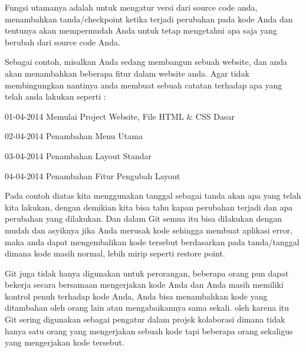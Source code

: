 \noindent 
Fungsi utamanya adalah untuk mengatur versi dari source code anda, menambahkan tanda/checkpoint ketika terjadi perubahan pada kode Anda dan tentunya akan mempermudah Anda untuk tetap mengetahui apa saja yang berubah dari source code Anda. \par
\vspace{12pt}
\noindent 
Sebagai contoh, misalkan Anda sedang membangun sebuah website, dan anda akan menambahkan beberapa fitur dalam website anda. Agar tidak membingungkan nantinya anda membuat sebuah catatan terhadap apa yang telah anda lakukan seperti : \par
\vspace{12pt}
\noindent 
 \hspace*{0.5in} 01-04-2014 Memulai Project Website, File HTML  $  \&  $ CSS Dasar \par
\noindent 
 \hspace*{0.5in} 02-04-2014 Penambahan Menu Utama \par
\noindent 
 \hspace*{0.5in} 03-04-2014 Penambahan Layout Standar \par
\noindent 
 \hspace*{0.5in} 04-04-2014 Penambahan Fitur Pengubah Layout \par
\vspace{12pt}
\vspace{12pt}
\noindent 
 \hspace*{0.5in} Pada contoh diatas kita menggunakan tanggal sebagai tanda akan apa yang telah kita lakukan, dengan demikian kita bisa tahu kapan perubahan terjadi dan apa perubahan yang dilakukan. Dan dalam Git semua itu bisa dilakukan dengan mudah dan asyiknya jika Anda merusak kode sehingga membuat aplikasi error, maka anda dapat mengembalikan kode tersebut berdasarkan pada tanda/tanggal dimana kode masih normal, lebih mirip seperti restore point. \par
\vspace{12pt}
\noindent 
Git juga tidak hanya digunakan untuk perorangan, beberapa orang pun dapat bekerja secara bersamaan mengerjakan kode Anda dan Anda masih memiliki kontrol penuh terhadap kode Anda, Anda bisa menambahkan kode yang ditambahan oleh orang lain atau mengabaikannya sama sekali. oleh karena itu Git sering digunakan sebagai pengatur dalam projek kolaborasi dimana tidak hanya satu orang yang mengerjakan sebuah kode tapi beberapa orang sekaligus yang mengerjakan kode tersebut. \par
\vspace{12pt}
